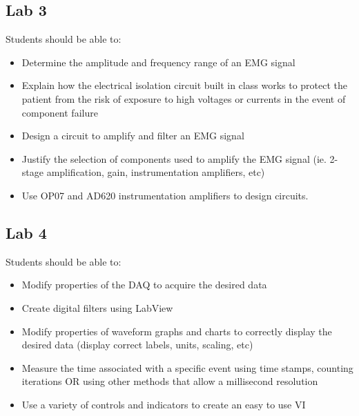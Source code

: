\documentclass{article}
\begin{document}
\subsection*{Lab 3}
Students should be able to:
\begin{itemize}
	\item Determine the amplitude and frequency range of an EMG signal
	\item Explain how the electrical isolation circuit built in class works to protect the patient from the risk of exposure to high voltages or currents in the event of component failure
	\item Design a circuit to amplify and filter an EMG signal
	\item Justify the selection of components used to amplify the EMG signal (ie. 2-stage amplification, gain, instrumentation amplifiers, etc)
	\item Use OP07 and AD620 instrumentation amplifiers to design circuits.  
\end{itemize}

\subsection*{Lab 4}
Students should be able to:
\begin{itemize}
	\item Modify properties of the DAQ to acquire the desired data
	\item Create digital filters using LabView
	\item Modify properties of waveform graphs and charts to correctly display the desired data (display correct labels, units, scaling, etc)
	\item Measure the time associated with a specific event using time stamps, counting iterations OR using other methods that allow a millisecond resolution
	\item Use a variety of controls and indicators to create an easy to use VI
\end{itemize}
\end{document}
